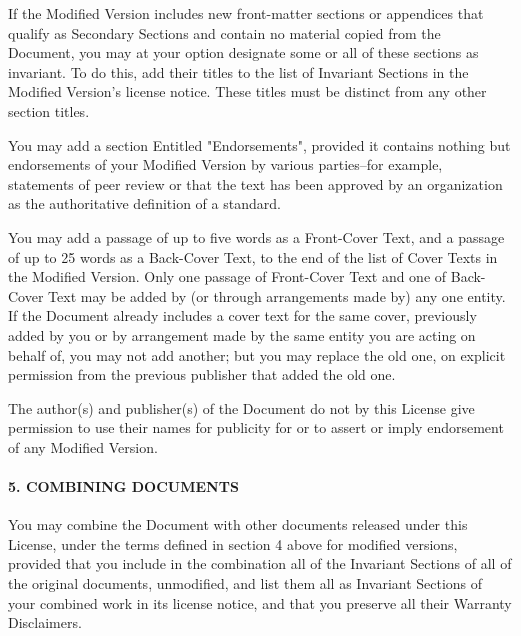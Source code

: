 \begin{multicols}{2}
{\footnotesize If the Modified Version includes new front-matter sections or appendices that qualify as Secondary Sections and contain no material copied from the Document, you may at your option designate some or all of these sections as invariant. To do this, add their titles to the list of Invariant Sections in the Modified Version's license notice.  These titles must be distinct from any other section titles.}{\footnotesize \par}

{\footnotesize You may add a section Entitled "Endorsements", provided it contains nothing but endorsements of your Modified Version by various parties--for example, statements of peer review or that the text has been approved by an organization as the authoritative definition of a standard.}{\footnotesize \par}

{\footnotesize You may add a passage of up to five words as a Front-Cover Text, and a passage of up to 25 words as a Back-Cover Text, to the end of the list of Cover Texts in the Modified Version. Only one passage of Front-Cover Text and one of Back-Cover Text may be added by (or through arrangements made by) any one entity. If the Document already includes a cover text for the same cover, previously added by you or by arrangement made by the same entity you are acting on behalf of, you may not add another; but you may replace the old one, on explicit permission from the previous publisher that added the old one.}{\footnotesize \par}

{\footnotesize The author(s) and publisher(s) of the Document do not by this License give permission to use their names for publicity for or to assert or imply endorsement of any Modified Version.}{\footnotesize \par}


\paragraph{{\footnotesize 5. COMBINING DOCUMENTS}}

{\footnotesize You may combine the Document with other documents released under this License, under the terms defined in section 4 above for modified versions, provided that you include in the combination all of the Invariant Sections of all of the original documents, unmodified, and list them all as Invariant Sections of your combined work in its license notice, and that you preserve all their Warranty Disclaimers.}{\footnotesize \par}


\end{multicols}
